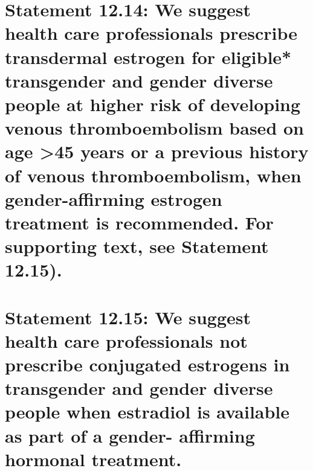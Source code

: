 \documentclass[
]{book}
\begin{document}
\hypertarget{statement-12.14-we-suggest-health-care-professionals-prescribe-transdermal-estrogen-for-eligible-transgender-and-gender-diverse-people-at-higher-risk-of-developing-venous-thromboembolism-based-on-age-45-years-or-a-previous-history-of-venous-thromboembolism-when-gender-affirming-estrogen-treatment-is-recommended.-for-supporting-text-see-statement-12.15.}{%
\section*{Statement 12.14: We suggest health care professionals prescribe transdermal estrogen for eligible* transgender and gender diverse people at higher risk of developing venous thromboembolism based on age \textgreater45 years or a previous history of venous thromboembolism, when gender-affirming estrogen treatment is recommended. For supporting text, see Statement 12.15).}\label{statement-12.14-we-suggest-health-care-professionals-prescribe-transdermal-estrogen-for-eligible-transgender-and-gender-diverse-people-at-higher-risk-of-developing-venous-thromboembolism-based-on-age-45-years-or-a-previous-history-of-venous-thromboembolism-when-gender-affirming-estrogen-treatment-is-recommended.-for-supporting-text-see-statement-12.15.}}

\hypertarget{statement-12.15-we-suggest-health-care-professionals-not-prescribe-conjugated-estrogens-in-transgender-and-gender-diverse-people-when-estradiol-is-available-as-part-of-a-gender--affirming-hormonal-treatment.}{%
\section*{Statement 12.15: We suggest health care professionals not prescribe conjugated estrogens in transgender and gender diverse people when estradiol is available as part of a gender- affirming hormonal treatment.}\label{statement-12.15-we-suggest-health-care-professionals-not-prescribe-conjugated-estrogens-in-transgender-and-gender-diverse-people-when-estradiol-is-available-as-part-of-a-gender--affirming-hormonal-treatment.}}
\end{document}
